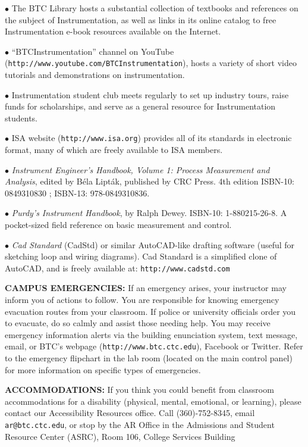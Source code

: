 \item{$\bullet$} The BTC Library hosts a substantial collection of textbooks and references on the subject of Instrumentation, as well as links in its online catalog to free Instrumentation e-book resources available on the Internet.
\item{$\bullet$} ``BTCInstrumentation'' channel on YouTube ({\tt http://www.youtube.com/BTCInstrumentation}), hosts a variety of short video tutorials and demonstrations on instrumentation.
\item{$\bullet$} Instrumentation student club meets regularly to set up industry tours, raise funds for scholarships, and serve as a general resource for Instrumentation students.
\item{$\bullet$} ISA website ({\tt http://www.isa.org}) provides all of its standards in electronic format, many of which are freely available to ISA members.
\item{$\bullet$} {\it Instrument Engineer's Handbook, Volume 1: Process Measurement and Analysis}, edited by B\'ela Lipt\'ak, published by CRC Press.  4th edition ISBN-10: 0849310830 ; ISBN-13: 978-0849310836.
\item{$\bullet$} {\it Purdy's Instrument Handbook}, by Ralph Dewey.  ISBN-10: 1-880215-26-8.  A pocket-sized field reference on basic measurement and control.
\item{$\bullet$} {\it Cad Standard} (CadStd) or similar AutoCAD-like drafting software (useful for sketching loop and wiring diagrams).  Cad Standard is a simplified clone of AutoCAD, and is freely available at: {\tt http://www.cadstd.com}

\vskip 10pt

\noindent
{\bf CAMPUS EMERGENCIES:} If an emergency arises, your instructor may inform you of actions to follow.  You are responsible for knowing emergency evacuation routes from your classroom.  If police or university officials order you to evacuate, do so calmly and assist those needing help.  You may receive emergency information alerts via the building enunciation system, text message, email, or BTC's webpage ({\tt http://www.btc.ctc.edu}), Facebook or Twitter.  Refer to the emergency flipchart in the lab room (located on the main control panel) for more information on specific types of emergencies.

\vskip 10pt

\noindent
{\bf ACCOMMODATIONS:} If you think you could benefit from classroom accommodations for a disability (physical, mental, emotional, or learning), please contact our Accessibility Resources office.  Call (360)-752-8345, email {\tt ar@btc.ctc.edu}, or stop by the AR Office in the Admissions and Student Resource Center (ASRC), Room 106, College Services Building




\vskip 10pt




\vfil 

\eject


